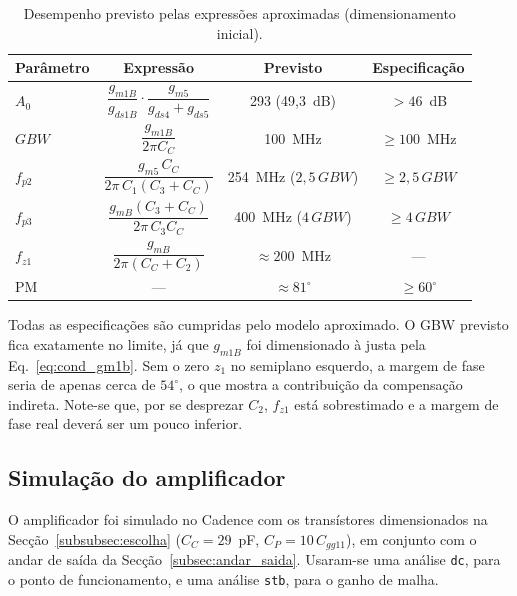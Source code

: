 \begin{table}[H]
    \centering
    \caption{Desempenho previsto pelas expressões aproximadas (dimensionamento inicial).}
    \label{tab:desempenho_previsto}
    \begin{tabular}{lccc}
        \toprule
        Parâmetro & Expressão & Previsto & Especificação \\
        \midrule
        $A_0$          & $\dfrac{g_{m1B}}{g_{ds1B}}\cdot\dfrac{g_{m5}}{g_{ds4}+g_{ds5}}$ & 293 (49,3~dB) & $> 46$~dB \\[2ex]
        $GBW$          & $\dfrac{g_{m1B}}{2\pi C_C}$                                    & 100~MHz       & $\ge 100$~MHz \\[2ex]
        $f_{p2}$       & $\dfrac{g_{m5}\,C_C}{2\pi\,C_1(C_3 + C_C)}$                    & 254~MHz ($2{,}5\,GBW$) & $\ge 2{,}5\,GBW$ \\[2ex]
        $f_{p3}$       & $\dfrac{g_{mB}(C_3 + C_C)}{2\pi\,C_3 C_C}$                     & 400~MHz ($4\,GBW$)     & $\ge 4\,GBW$ \\[2ex]
        $f_{z1}$       & $\dfrac{g_{mB}}{2\pi(C_C + C_2)}$                              & $\approx 200$~MHz      & --- \\[1ex]
        PM             & ---                                                            & $\approx 81^\circ$     & $\ge 60^\circ$ \\
        \bottomrule
    \end{tabular}
\end{table}
 
Todas as especificações são cumpridas pelo modelo aproximado. O GBW previsto fica exatamente no limite, já que $g_{m1B}$
foi dimensionado à justa pela Eq.~\eqref{eq:cond_gm1b}. Sem o zero $z_1$ no semiplano esquerdo, a margem de fase seria
de apenas cerca de $54^\circ$, o que mostra a contribuição da compensação indireta. Note-se que, por se desprezar $C_2$,
$f_{z1}$ está sobrestimado e a margem de fase real deverá ser um pouco inferior.


\subsection{Simulação do amplificador}
\label{subsec:sim_amp}
\label{subsubsec:aprox_exato}

O amplificador foi simulado no Cadence com os transístores dimensionados na Secção~\ref{subsubsec:escolha}
($C_C = 29$~pF, $C_P = 10\,C_{gg11}$), em conjunto com o andar de saída da Secção~\ref{subsec:andar_saida}.
Usaram-se uma análise \texttt{dc}, para o ponto de funcionamento, e uma análise \texttt{stb}, para o ganho de malha.


